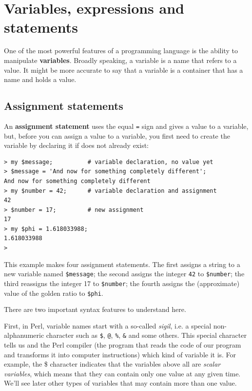 \chapter{Variables, expressions and statements}

One of the most powerful features of a programming language 
is the ability to manipulate {\bf variables}.  Broadly 
speaking, a variable is a name that refers to a value. It 
might be more accurate to say that a variable is a container 
that has a name and holds a value.


\section{Assignment statements}
\label{variables}

An {\bf assignment statement} uses the equal {\tt =} sign 
and  gives a value to a variable, but, before you can assign 
a value to a variable, you first need to 
create the variable by declaring it if does not already 
exist:

\begin{verbatim}
> my $message;          # variable declaration, no value yet
> $message = 'And now for something completely different';
And now for something completely different
> my $number = 42;      # variable declaration and assignment
42
> $number = 17;         # new assignment
17
> my $phi = 1.618033988;
1.618033988
>
\end{verbatim}
%

This example makes four assignment statements.  The first 
assigns a string to a new variable named {\tt \$message};
the second assigns the integer {\tt 42} to {\tt \$number}; the 
third reassigns the integer 17 to {\tt \$number}; the fourth 
assigns the (approximate) value of the golden ratio to {\tt \$phi}.

There are two important syntax features to understand here.

First, in Perl, variable names start with a so-called 
\emph{sigil}, i.e. a special non-alphanumeric character such 
as \verb'$', \verb'@', \verb'%', \verb'&' and some others. 
This special character 
tells us and the Perl compiler (the program that reads 
the code of our program and transforms it into computer 
instructions) which kind of variable it is. For example, the 
\$ character indicates that the variables above all are \emph{scalar variables}, which means that they can contain only one value at any given time. We'll see later other types of variables that may contain more than one value.

